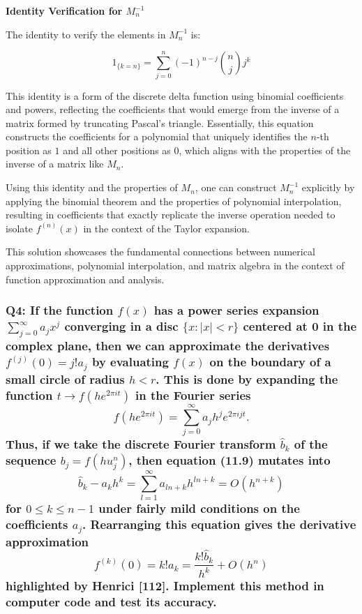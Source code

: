 \documentclass[8pt]{article}
\begin{document}
\textbf{Identity Verification for \( M_n^{-1} \)}

The identity to verify the elements in \( M_n^{-1} \) is:

\[
1_{\{k=n\}} = \sum_{j=0}^n (-1)^{n-j} \binom{n}{j} j^k
\]

This identity is a form of the discrete delta function using binomial coefficients and powers, reflecting the coefficients that would emerge from the inverse of a matrix formed by truncating Pascal’s triangle. Essentially, this equation constructs the coefficients for a polynomial that uniquely identifies the \( n \)-th position as \( 1 \) and all other positions as \( 0 \), which aligns with the properties of the inverse of a matrix like \( M_n \).

Using this identity and the properties of \( M_n \), one can construct \( M_n^{-1} \) explicitly by applying the binomial theorem and the properties of polynomial interpolation, resulting in coefficients that exactly replicate the inverse operation needed to isolate \( f^{(n)}(x) \) in the context of the Taylor expansion.

This solution showcases the fundamental connections between numerical approximations, polynomial interpolation, and matrix algebra in the context of function approximation and analysis.

\subsubsection*{Q4: If the function \( f(x) \) has a power series expansion \( \sum_{j=0}^{\infty} a_j x^j \) converging in a disc \(\{x : |x| < r\}\) centered at 0 in the complex plane, then we can approximate the derivatives \( f^{(j)}(0) = j!a_j \) by evaluating \( f(x) \) on the boundary of a small circle of radius \( h < r \). This is done by expanding the function \( t \rightarrow f(he^{2\pi i t}) \) in the Fourier series
\[
f(he^{2\pi it}) = \sum_{j=0}^{\infty} a_j h^j e^{2\pi i jt}.
\]
Thus, if we take the discrete Fourier transform \( \hat{b}_k \) of the sequence \( b_j = f(hu_j^n) \), then equation (11.9) mutates into
\[
\hat{b}_k - a_k h^k = \sum_{l=1}^{\infty} a_{ln+k} h^{ln+k} = O(h^{n+k})
\]
for \( 0 \leq k \leq n - 1 \) under fairly mild conditions on the coefficients \( a_j \). Rearranging this equation gives the derivative approximation
\[
f^{(k)}(0) = k! a_k = \frac{k! \hat{b}_k}{h^k} + O(h^n)
\]
highlighted by Henrici [112]. Implement this method in computer code and test its accuracy.}
\end{document}
